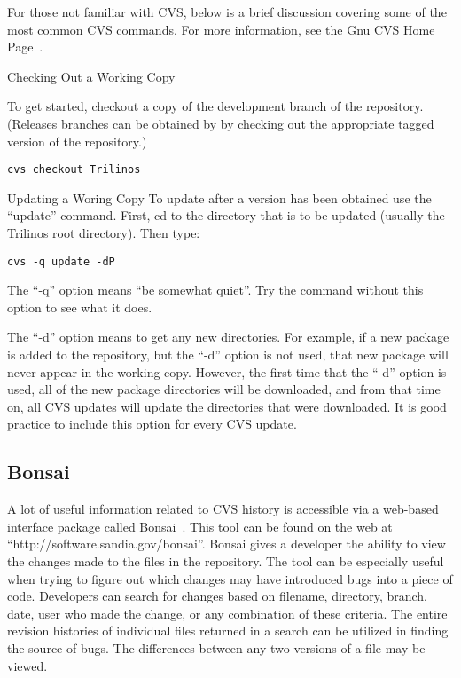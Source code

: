 \documentclass[12pt,relax]{SANDreport}
\begin{document}
For those not familiar with CVS, below is a brief discussion covering some 
of the most common CVS commands.  For more information, see the Gnu CVS Home
Page~\cite{CVS}.

Checking Out a Working Copy

To get started, checkout a copy of the development branch of the repository.
(Releases branches can be obtained by by checking out the appropriate 
tagged version of the repository.)

\begin{verbatim}
cvs checkout Trilinos
\end{verbatim}

Updating a Woring Copy
To update after a version has been obtained use the ``update'' command.  
First, cd to the directory that is to be updated (usually the Trilinos root 
directory).  Then type:

\begin{verbatim}
cvs -q update -dP
\end{verbatim}

The ``-q'' option means ``be somewhat quiet''.  Try the command without this
option to see what it does.  

The ``-d'' option means to get any new directories.  For example, if a new 
package is added to the repository, but the ``-d'' option is not used, that 
new package will never appear in the working copy.  However, the first time 
that the ``-d'' option is used, all of the new package directories will be 
downloaded, and from that time on, all CVS updates will update the 
directories that were downloaded.  It is good practice to include this 
option for every CVS update.


\subsection{Bonsai}
A lot of useful information related to CVS history is accessible via a
web-based interface package called Bonsai~\cite{Bonsai}.  This tool can be 
found on the web at ``http://software.sandia.gov/bonsai''.  Bonsai gives a 
developer the ability to view the changes made to the files in the 
repository.  The tool can be especially useful when trying to figure out which 
changes may have introduced bugs into a piece of code.  Developers can search 
for changes based on filename, directory, branch, date, user who made the 
change, or any combination of these criteria.  The entire revision histories of
individual files returned in a search can be utilized in finding the source of 
bugs.  The differences between any two versions of a file may be viewed.  
\end{document}
